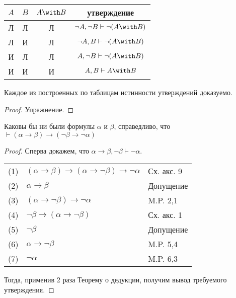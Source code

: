 \begin{tabular}{cccc}\label{valuation_formula}
$A$ & $B$ & $A \with B$ & утверждение\\
\hline
Л & Л & Л & $\neg A, \neg B \vdash \neg (A \with B)$\\
Л & И & Л & $\neg A, B \vdash \neg (A \with B)$\\
И & Л & Л & $A, \neg B \vdash \neg (A \with B)$\\
И & И & И & $A, B \vdash A \with B$
\end{tabular}

\begin{lemma}
Каждое из построенных по таблицам истинности утверждений доказуемо.
\end{lemma}
\begin{proof} Упражнение.
\end{proof}

\begin{lemma}\label{contraposition}Каковы бы ни были формулы $\alpha$ и $\beta$, справедливо, что 
$\vdash (\alpha \rightarrow \beta) \rightarrow (\neg\beta \rightarrow \neg\alpha)$
\end{lemma}

\begin{proof}
Сперва докажем, что $\alpha \rightarrow \beta, \neg\beta \vdash \neg\alpha$.

\begin{tabular}{lll}
(1) & $(\alpha \rightarrow \beta) \rightarrow (\alpha \rightarrow \neg\beta) \rightarrow \neg\alpha$ & Сх. акс. 9\\
(2) & $\alpha \rightarrow \beta$ & Допущение\\
(3) & $(\alpha \rightarrow \neg\beta) \rightarrow \neg\alpha$ & M.P. 2,1\\
(4) & $\neg\beta \rightarrow (\alpha \rightarrow \neg\beta)$ & Сх. акс. 1\\
(5) & $\neg\beta$ & Допущение\\
(6) & $\alpha \rightarrow \neg\beta$ & M.P. 5,4\\
(7) & $\neg\alpha$ & M.P. 6,3
\end{tabular}


Тогда, применив 2 раза Теорему о дедукции, получим вывод требуемого утверждения.
\end{proof}

